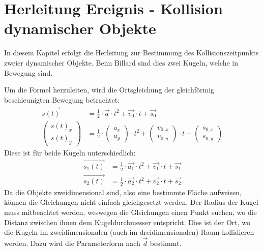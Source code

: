 \section{Herleitung Ereignis - Kollision dynamischer Objekte}\label{anhang:herleitung:event:dynamicObjectCollision}
In diesem Kapitel erfolgt die Herleitung zur Bestimmung des Kollisionszeitpunkts zweier dynamischer Objekte. Beim Billard
sind dies zwei Kugeln, welche in Bewegung sind.

Um die Formel herzuleiten, wird die Ortsgleichung der gleichförmig beschleunigten Bewegung betrachtet:
\begin{align}
    \vec{s(t)} &= \frac{1}{2} \cdot \vec{a} \cdot t^2 + \vec{v_0} \cdot t + \vec{s_0}\\
    \begin{pmatrix}s(t)_x\\s(t)_y\end{pmatrix} &= \frac{1}{2} \cdot \begin{pmatrix}a_x\\a_y\end{pmatrix} \cdot t^2 + \begin{pmatrix}v_{0, x}\\v_{0, y}\end{pmatrix} \cdot t + \begin{pmatrix}s_{0, x}\\s_{0, y}\end{pmatrix}
\end{align}
Diese ist für beide Kugeln unterschiedlich:
\begin{align}
    \vec{s_1(t)} &= \frac{1}{2} \cdot \vec{a_1} \cdot t^2 + \vec{v_{1}} \cdot t + \vec{s_{1}}\\
    \vec{s_2(t)} &= \frac{1}{2} \cdot \vec{a_2} \cdot t^2 + \vec{v_{2}} \cdot t + \vec{s_{2}}
\end{align}
Da die Objekte zweidimensional sind, also eine bestimmte Fläche aufweisen, können die Gleichungen nicht einfach gleichgesetzt
werden. Der Radius der Kugel muss mitbeachtet werden, weswegen die Gleichungen einen Punkt suchen, wo die
Distanz zwischen ihnen dem Kugeldurchmesser entspricht. Dies ist der Ort, wo die Kugeln im zweidimensionalen
(auch im dreidimensionalen) Raum kollidieren werden. Dazu wird die Parameterform nach $\vec{d}$ bestimmt.
